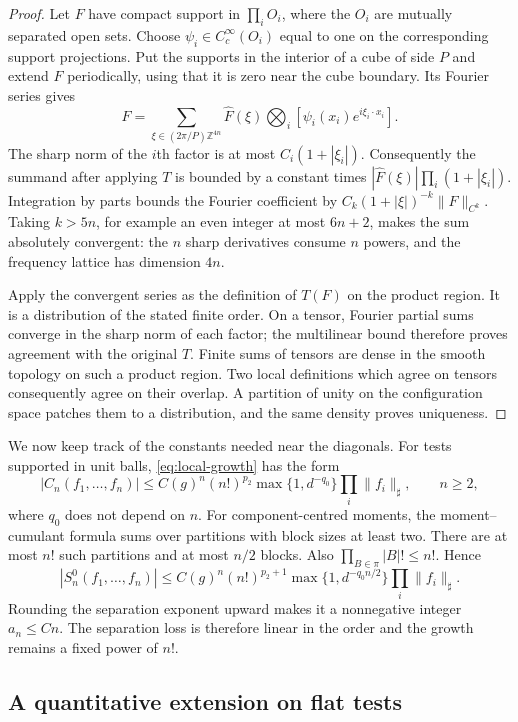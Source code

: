 \documentclass[11pt,letterpaper,reqno]{amsart}
\theoremstyle{definition}
\theoremstyle{remark}
\begin{document}
\begin{proof}
Let $F$ have compact support in $\prod_iO_i$, where the $O_i$ are
mutually separated open sets. Choose $\psi_i\in C_c^\infty(O_i)$
equal to one on the corresponding support projections. Put the supports
in the interior of a cube of side $P$ and extend $F$ periodically,
using that it is zero near the cube boundary. Its Fourier series gives
\[
 F=\sum_{\xi\in(2\pi/P)\mathbb Z^{4n}}\widehat F(\xi)
             \bigotimes_i[\psi_i(x_i)e^{i\xi_i\cdot x_i}].
\]
The sharp norm of the $i$th factor is at most $C_i(1+|\xi_i|)$.
Consequently the summand after applying $T$ is bounded by a constant
times $|\widehat F(\xi)|\prod_i(1+|\xi_i|)$.
Integration by parts bounds the Fourier coefficient by
$C_k(1+|\xi|)^{-k}\|F\|_{C^k}$. Taking $k>5n$, for example an
even integer at most $6n+2$, makes the sum absolutely convergent:
the $n$ sharp derivatives consume $n$ powers, and the frequency
lattice has dimension $4n$.

Apply the convergent series as the definition of $T(F)$ on the product
region. It is a distribution of the stated finite order. On a tensor,
Fourier partial sums converge in the sharp norm of each factor; the
multilinear bound therefore proves agreement with the original $T$.
Finite sums of tensors are dense in the smooth topology on such a
product region. Two local definitions which agree on tensors consequently
agree on their overlap. A partition of unity on the configuration space
patches them to a distribution, and the same density proves uniqueness.
\end{proof}

We now keep track of the constants needed near the diagonals. For tests
supported in unit balls, \eqref{eq:local-growth} has the form
\[
 |C_n(f_1,\ldots,f_n)|
       \le C(g)^n(n!)^{p_2}\max\{1,d^{-q_0}\}
                                    \prod_i\|f_i\|_\sharp,
 \qquad n\ge2,
\]
where $q_0$ does not depend on $n$. For component-centred moments,
the moment--cumulant formula sums over partitions with block sizes at
least two. There are at most $n!$ such partitions and at most $n/2$
blocks. Also $\prod_{B\in\pi}|B|!\le n!$. Hence
\[
 |S_n^0(f_1,\ldots,f_n)|
   \le C(g)^n(n!)^{p_2+1}
           \max\{1,d^{-q_0n/2}\}\prod_i\|f_i\|_\sharp.
\]
Rounding the separation exponent upward makes it a nonnegative integer
$a_n\le Cn$. The separation loss is therefore linear in the order
and the growth remains a fixed power of $n!$.

\subsection{A quantitative extension on flat tests}
\end{document}
